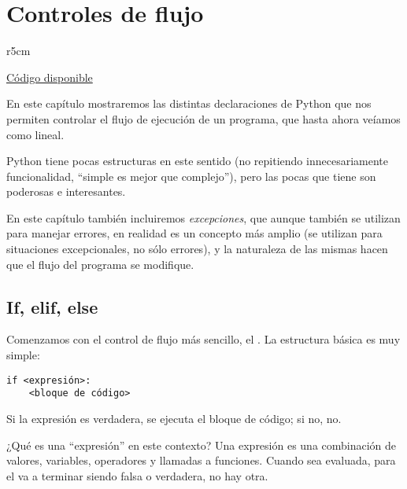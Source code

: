 

\chapter{Controles de flujo}

\begin{wraptable}{r}{5cm}
\begin{modulesinfo}
\begin{center}
{\small
    \href{https://github.com/facundobatista/libro-pyciencia/tree/master/código/py_controles_flujo/}{Código disponible}
}
\end{center}
\end{modulesinfo}
\end{wraptable}

En este capítulo mostraremos las distintas declaraciones de Python que nos permiten controlar el flujo de ejecución de un programa, que hasta ahora veíamos como lineal.

Python tiene pocas estructuras en este sentido (no repitiendo innecesariamente funcionalidad, ``simple es mejor que complejo''), pero las pocas que tiene son poderosas e interesantes.

En este capítulo también incluiremos \textit{excepciones}, que aunque también se utilizan para manejar errores, en realidad es un concepto más amplio (se utilizan para situaciones excepcionales, no sólo errores), y la naturaleza de las mismas hacen que el flujo del programa se modifique.


\section{If, elif, else}\label{sec:if}

Comenzamos con el control de flujo más sencillo, el . La estructura básica es muy simple:

\begin{verbatim}
if <expresión>:
    <bloque de código>
\end{verbatim}

Si la expresión es verdadera, se ejecuta el bloque de código; si no, no.

¿Qué es una ``expresión'' en este contexto? Una expresión es una combinación de valores, variables, operadores y llamadas a funciones. Cuando sea evaluada, para el  va a terminar siendo falsa o verdadera, no hay otra. 

